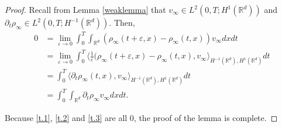 \documentclass{amsart}
\def\R{\mathbb R}
\begin{document}
\begin{proof}
  Recall from Lemma \ref{weaklemma} that $v_\infty \in L^2(0,T;H^1(\R^d))$ and $\partial_t \rho_\infty \in L^2(0,T;H^{-1}(\R^d)).$ Then, 
  \begin{align*}
 0&= \lim_{\varepsilon \rightarrow 0} \int_{0}^{T}\int_{\R^d}(\rho_\infty(t+\varepsilon,x)-\rho_\infty(t,x))v_\infty dx dt \\&=\lim_{\varepsilon \rightarrow 0}\int_{0}^T \langle\frac{1}{\varepsilon}(
  \rho_\infty(t+\varepsilon,x)-\rho_\infty(t,x),v_\infty \rangle_{H^{-1}(\R^d),H^1(\R^d)}dt\\&=\int_{0}^{T}\langle \partial_t \rho_\infty (t,x),v_\infty \rangle_{H^{-1}(\R^d),H^1(\R^d)} dt \\
  &=\int_{0}^{T}\int_{\R^d}\partial_t \rho_\infty v_\infty dx dt.
  \end{align*}
 
  Because \eqref{t.1}, \eqref{t.2} and \eqref{t.3} are all $0$, the proof of the lemma is complete.
 
\end{proof}
\end{document}
